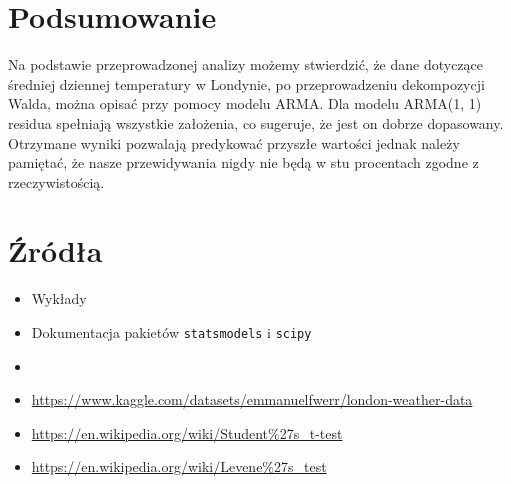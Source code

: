 \documentclass{article}
\theoremstyle{break}
\newcommand{\code}[1]{\colorbox{light-gray}{\texttt{#1}}}
\begin{document}
	\section{Podsumowanie}
	
	Na podstawie przeprowadzonej analizy możemy stwierdzić, że dane dotyczące średniej dziennej temperatury w Londynie, po przeprowadzeniu dekompozycji Walda, można opisać przy pomocy modelu ARMA. Dla modelu ARMA(1, 1) residua spełniają wszystkie założenia, co sugeruje, że jest on dobrze dopasowany. Otrzymane wyniki pozwalają predykować przyszłe wartości jednak należy pamiętać, że nasze przewidywania nigdy nie będą w stu procentach zgodne z rzeczywistością.
	
	\section{Źródła}
	\begin{itemize}
		\item Wykłady
		\item Dokumentacja pakietów \code{statsmodels} i \code{scipy}
		\item \url{}
		\item \url{https://www.kaggle.com/datasets/emmanuelfwerr/london-weather-data}
		\item \url{https://en.wikipedia.org/wiki/Student%27s_t-test}
		\item \url{https://en.wikipedia.org/wiki/Levene%27s_test}
		
	\end{itemize}
	
	
\end{document}
